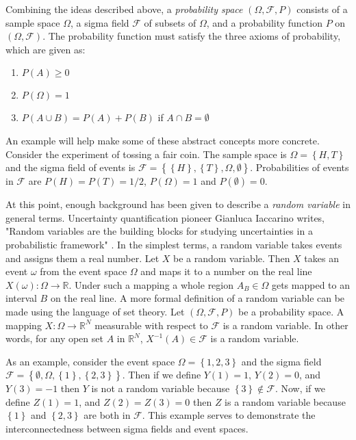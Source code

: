 Combining the ideas described above, a \textit{probability space} $\left(\Omega,\mathcal{F},P \right)$ consists of a sample space $\Omega$, a sigma field $\mathcal{F}$ of subsets of $\Omega$, and a probability function $P$ on $\left(\Omega,\mathcal{F}\right)$. The probability function must satisfy the three axioms of probability, which are given as:
\begin{enumerate}
   \item $P(A)\geq 0$
   \item $P\left(\Omega\right)=1$
   \item $P\left(A\cup B\right)=P\left(A\right)+P\left(B\right)$ if
      $A\cap B=\emptyset$
\end{enumerate} 
An example will help make some of these abstract concepts more concrete. Consider the experiment of tossing a fair coin. The sample space is $\Omega =\left\lbrace H,T\right\rbrace$  and the sigma field of events is  $\mathcal{F}=\left\{\left\{H\right\},\left\{T\right\}, \Omega,\emptyset\right\}$. Probabilities of events in $\mathcal{F}$ are $P\left({H}\right) = P\left({T}\right)=1/2$, $P\left(\Omega\right) = 1$ and $P\left(\emptyset\right) = 0$.

At this point, enough background has been given to describe a \textit{random variable} in general terms. Uncertainty quantification pioneer Gianluca Iaccarino writes, "Random variables are the building blocks for studying uncertainties in a probabilistic framework" \cite{Iaccarino_quote}. In the simplest terms, a random variable takes events and assigns them a real number. Let $X$ be a random variable. Then $X$ takes an event $\omega$ from the event space $\Omega$ and maps it to a number on the real line $X\left(\omega\right): \Omega \rightarrow \mathbb{R}$. Under such a mapping a whole region $A_B \in \Omega$ gets mapped to an interval $B$ on the real line. A more formal definition of a random variable can be made using the language of set theory. Let $\left(\Omega,\mathcal{F},P\right)$ be a probability space. A mapping $X:\Omega \rightarrow \mathbb{R}^N$ measurable with respect to $\mathcal{F}$ is a random variable. In other words, for any open set $A$ in $\mathbb{R}^N$, $X^{-1}\left(A\right) \in \mathcal{F}$ is a random variable.

As an example, consider the event space $\Omega=\left\{1,2,3\right\}$ and the sigma field \ $\mathcal{F}=\left\{\emptyset, \Omega, \left\{1\right\}, \left\{2,3\right\}\right\}$. Then if we define $Y\left(1\right)=1$, $Y\left(2\right)=0$, and $Y\left(3\right)=-1$ then $Y$ is not a random variable because $\left\{3\right\}\notin \mathcal{F}$. Now, if we define $Z\left(1\right)=1$, and $Z\left(2\right)=Z\left(3\right)=0$ then $Z$ is a random variable because $\left\{1\right\}$ and $\left\{2,3\right\}$ are both in $\mathcal{F}$. This example serves to demonstrate the interconnectedness between  sigma fields and event spaces.


